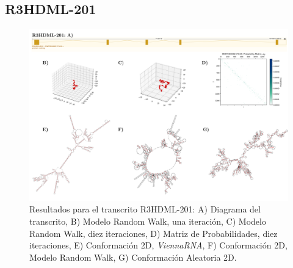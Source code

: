 \documentclass[a4paper,11pt,titlepage]{article}
\theoremstyle{definition}
\begin{document}
\subsection*{R3HDML-201}\label{subsec:gene5}

\begin{figure}[H]
    \centering
    \includegraphics[width=\textwidth]{images/R3HDML-201_full.png}
    \small{\caption{Resultados para el transcrito R3HDML-201: A) Diagrama del transcrito, B) Modelo Random Walk, una iteración, C) Modelo Random Walk, diez iteraciones, D) Matriz de Probabilidades, diez iteraciones, E) Conformación 2D, \textit{ViennaRNA}, F) Conformación 2D, Modelo Random Walk, G) Conformación Aleatoria 2D.}}\normalsize
    \label{fig:R3HDML-201-diag}
\end{figure}
\end{document}
